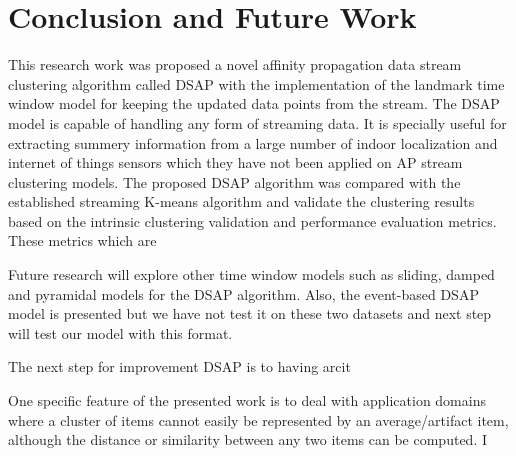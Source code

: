 \setlength{\parindent}{2em}

% 
\chapter{Conclusion and Future Work}

This research work was proposed a novel affinity propagation data stream clustering algorithm called DSAP with the implementation of the landmark time window model for keeping the updated data points from the stream. The DSAP model is capable of handling any form of streaming data. It is specially useful for extracting summery information from a large number of indoor localization and internet of things sensors which they have not been applied on AP stream clustering models.
The proposed DSAP algorithm was compared with the established streaming K-means algorithm and validate the clustering results based on the intrinsic clustering validation and performance evaluation metrics. These metrics which are 

Future research will explore other time window models such as sliding, damped and pyramidal models for the DSAP algorithm. Also, the event-based DSAP model is presented but we have not test it on these two datasets and next step will test our model with this format.

The next step for improvement DSAP is to having arcit


One specific feature of the presented work is to deal with application domains where a cluster of items cannot easily be represented by an average/artifact item, although the distance or similarity between any two items can be computed. I



